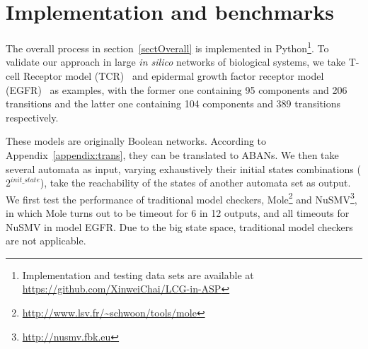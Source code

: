 \documentclass{article}
\theoremstyle{definition}
\begin{document}

\section{Implementation and benchmarks}\label{sect:5}
The overall process in section~\ref{sectOverall} is implemented in Python\footnote{Implementation and testing data sets are available at \url{https://github.com/XinweiChai/LCG-in-ASP}}. 
To validate our approach in large \textit{in silico} networks of biological systems, we take T-cell Receptor model (TCR)~\cite{saez2007logical} and epidermal growth factor receptor model (EGFR)~\cite{samaga2009logic} as examples, with the former one containing 95 components and 206 transitions and the latter one containing 104 components and 389 transitions respectively. 

These models are originally Boolean networks.
According to Appendix~\ref{appendix:trans}, they can be translated to ABANs. We then take several automata as input, varying exhaustively their initial states combinations ($2^{init\_state}$), take the reachability of the states of another automata set as output.
We first test the performance of traditional model checkers, Mole\footnote{\url{http://www.lsv.fr/~schwoon/tools/mole}} and NuSMV\footnote{\url{http://nusmv.fbk.eu}}, in which Mole turns out to be timeout for 6 in 12 outputs, and all timeouts for NuSMV in model EGFR.
Due to the big state space, traditional model checkers are not applicable. 
\end{document}
